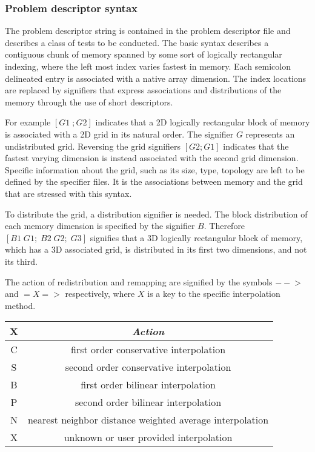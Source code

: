 \subsubsection{Problem descriptor syntax}
The problem descriptor string is contained in the problem descriptor file and describes a class of tests to be conducted. The basic syntax describes a contiguous chunk of memory spanned by some sort of logically rectangular indexing, where the left most index varies fastest in memory. Each semicolon delineated entry is associated with a native array dimension. The index locations are replaced by signifiers that express associations and distributions of the memory through the use of short descriptors. 

For example $[ G1 \; ; G2 ]$ indicates that a 2D logically rectangular block of memory is associated with a 2D grid in its natural order. The signifier $G$ represents an undistributed grid. Reversing the grid signifiers $[ G2; G1 ]$ indicates that the fastest varying dimension is instead associated with the second grid dimension. Specific information about the grid, such as its size, type, topology are left to be defined by the specifier files. It is the associations between memory and the grid that are stressed with this syntax.

To distribute the grid, a distribution signifier is needed. The block distribution of each memory dimension is specified by the signifier $B$. Therefore $[B1 \; G1; \; B2 \; G2; \; G3]$ signifies that a 3D logically rectangular block of memory, which has a 3D associated grid, is distributed in its first two dimensions, and not its third.

The action of redistribution and remapping are signified by the symbols $-- \!\!\! >$ and $=X=>$ respectively, where $X$ is a key to the specific interpolation method.

\begin{center}
\begin{tabular}{| c | c |} \hline \hline
{X} & {\em Action} \\
\hline
  C & first order conservative interpolation \\
  S & second order conservative interpolation \\
  B & first order bilinear interpolation \\
  P & second order bilinear interpolation \\
  N & nearest neighbor distance weighted average interpolation \\
  X & unknown or user provided interpolation \\
\hline
\end{tabular}
\end{center}

